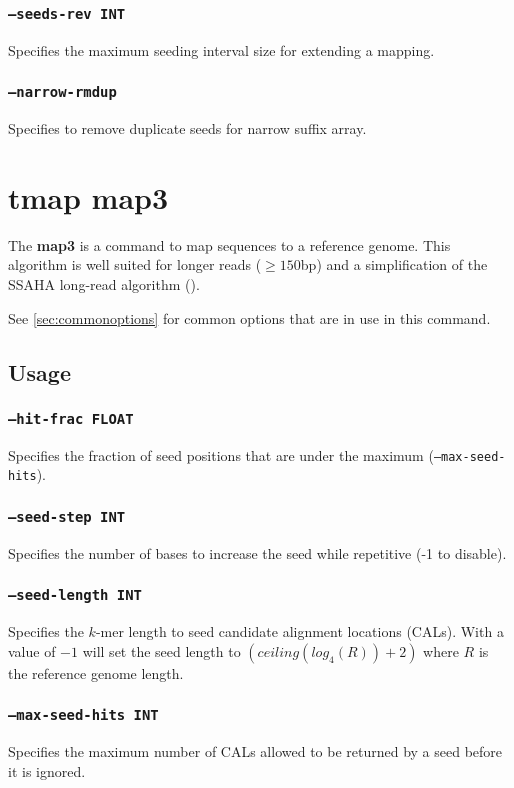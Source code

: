 \documentclass[a4paper,12pt]{book}
\newcommand{\TT}[1]{{\tt #1}} %
\newcommand{\BF}[1]{{\bf #1}} %
\begin{document}
\subsubsection{\TT{--seeds-rev INT}}
Specifies the maximum seeding interval size for extending a mapping.

\subsubsection{\TT{--narrow-rmdup}}
Specifies to remove duplicate seeds for narrow suffix array.

\section{tmap map3}
\label{sec:map3}
The \BF{map3} is a command to map sequences to a reference genome.
This algorithm is well suited for longer reads ($\geq 150$bp) and a simplification of the SSAHA long-read algorithm (\cite{SSAHA}).

See \autoref{sec:commonoptions} for common options that are in use in this command.

\subsection{Usage}

\subsubsection{\TT{--hit-frac FLOAT}}
Specifies the fraction of seed positions that are under the maximum (\TT{--max-seed-hits}).

\subsubsection{\TT{--seed-step INT}}
Specifies the number of bases to increase the seed while repetitive (-1 to disable).


\subsubsection{\TT{--seed-length INT}}
Specifies the $k$-mer length to seed candidate alignment locations (CALs).
With a value of $-1$ will set the seed length to $\left(ceiling(log_4(R)) + 2\right)$ where $R$ is the reference genome length.

\subsubsection{\TT{--max-seed-hits INT}}
Specifies the maximum number of CALs allowed to be returned by a seed before it is ignored.
\end{document}
